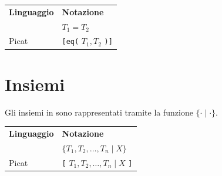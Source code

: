 \documentclass[12pt,a4paper,openright]{book} %
\begin{document}
\begin{appendices}
\begin{table}[H]
\center
\begin{tabular}{l l}
\textbf{Linguaggio} & \textbf{Notazione} \\
\lset{} & $T_1 = T_2$ \\
Picat & \verb|[eq(| $T_1, T_2$ \verb|)]| \\
\end{tabular}
\end{table}

\section{Insiemi}

Gli insiemi in \clpset{} sono rappresentati tramite la funzione $\{ \cdot \mid \cdot \}$.

\begin{table}[H]
\center
\begin{tabular}{l l}
\textbf{Linguaggio} & \textbf{Notazione} \\
\lset{} & $\{ T_1, T_2, \ldots, T_n \mid X \}$ \\
Picat & \verb|[| $T_1, T_2, \ldots, T_n \mid X$ \verb|]| \\
\end{tabular}
\end{table}

\end{appendices}


\printbibliography
\end{document}
